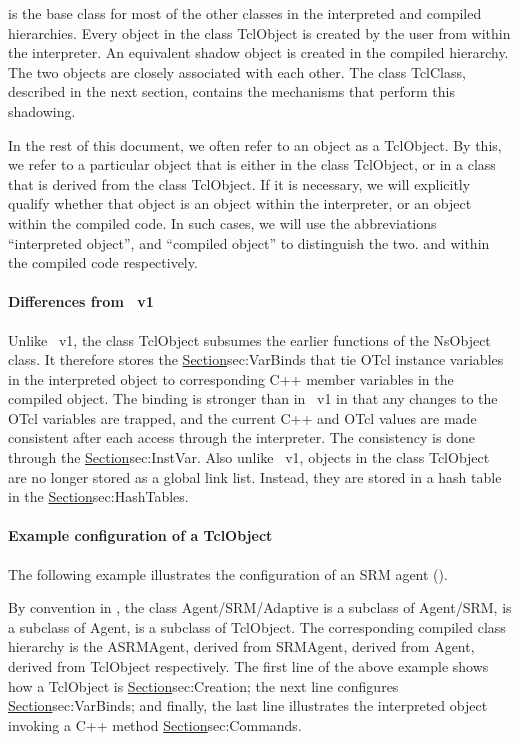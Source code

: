 is the base class for most of the other classes
in the interpreted and compiled hierarchies.
Every object in the class TclObject is created by the user
from within the interpreter.
An equivalent shadow object is created in the compiled hierarchy.
The two objects are closely associated with each other.
The class TclClass, described in the next section,
contains the mechanisms that perform this shadowing.

In the rest of this document, we often refer to an object as a TclObject.
By this, we refer to a particular object that is either in the class
TclObject, or in a class that is derived from the class TclObject.
If it is necessary, we will explicitly qualify whether that object is
an object within the interpreter, or an object within the compiled code.
In such cases,
we will use the abbreviations ``interpreted object'', and
``compiled object'' to distinguish the two.
and within the compiled code respectively.

\paragraph{Differences from \ns~v1}
Unlike \ns~v1, the class TclObject
subsumes the earlier functions of the NsObject class.
It therefore stores the
\href{interface variable bindings}{Section}{sec:VarBinds}
that tie OTcl instance variables in the interpreted object
to corresponding C++ member variables in the compiled object.
The binding is stronger than in \ns~v1 in that
any changes to the OTcl variables are trapped,
and the current C++ and OTcl values
are made consistent after each access through the interpreter.
The consistency is done through the
\href{class InstVar}{Section}{sec:InstVar}.
Also unlike \ns~v1, objects in the class TclObject
are no longer stored as a global link list.
Instead, they are stored in a hash table in the
\href{class Tcl}{Section}{sec:HashTables}.

\paragraph{Example configuration of a TclObject}
The following example illustrates the configuration of
an SRM agent ().
By convention in \ns,
the class Agent/SRM/Adaptive is a subclass of Agent/SRM,
is a subclass of Agent, is a subclass of TclObject.
The corresponding compiled class hierarchy is
the ASRMAgent, derived from SRMAgent, derived from Agent,
derived from TclObject respectively.
The first line of the above example shows how a TclObject is 
\href{created (or destroyed)}{Section}{sec:Creation};
the next line configures
\href{a bound variable}{Section}{sec:VarBinds};
and finally, the last line illustrates
the interpreted object invoking a C++ method
\href{as if they were an instance procedure}{Section}{sec:Commands}.

